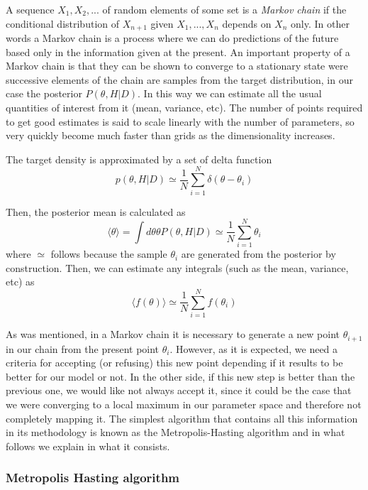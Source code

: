 \documentclass[onecolumn,           %
               showpacs,            %
               preprintnumbers,     %
               aps,                 %
               prl,          	    %
               letterpaper,             %
               superscriptaddress,      %
               nofootinbib,         %
               tightenlines,        %
               floats,floatfix      %
               ,usenatbib,
               ]{revtex4-1}
\begin{document}
A sequence $X_1,X_2,...$ of random elements of some set is a \textit{Markov chain} if the conditional distribution of $X_{n+1}$ given $X_1,...,X_n$ depends on $X_n$ only. In other words a Markov chain is a process where we can do predictions of the future based only in the information given at the present. An important property of a Markov chain is that they can be shown to converge to a stationary state were successive elements of the chain are samples from the target distribution, in our case the posterior $P(\theta,H|D)$. In this way we can estimate all the usual quantities of interest from it (mean, variance, etc). The number of points required to get good estimates is said to scale linearly with the number of parameters, so very quickly become much faster than grids as the dimensionality increases.

The target density is approximated by a set of delta function
\begin{equation}
p(\theta,H|D)\simeq \frac{1}{N}\sum_{i=1}^N \delta(\theta-\theta_i)
\end{equation}

Then, the posterior mean is calculated as
\begin{equation}
\langle\theta\rangle=\int d\theta \theta P(\theta,H|D)\simeq \frac{1}{N}\sum_{i=1}^N\theta_i
\end{equation}
where $\simeq$ follows because the sample $\theta_i$ are generated from the posterior by construction. Then, we can estimate any integrals (such as the mean, variance, etc) as
\begin{equation}
\langle f(\theta)\rangle \simeq\frac{1}{N}\sum_{i=1}^N f(\theta_i)
\end{equation}

As was mentioned, in a Markov chain it is necessary to generate a new point $\theta_{i+1}$ in our chain from the present point $\theta_i$. However, as it is expected, we need a criteria for accepting (or refusing) this new point depending if it results to be better for our model or not. In the other side, if this new step is better than the previous one, we would like not always accept it, since it could be the case that we were converging to a local maximum in our parameter space and therefore not completely mapping it. The simplest algorithm that contains all this information in its methodology is known as the Metropolis-Hasting algorithm and in what follows we explain in what it consists.
\subsubsection{Metropolis Hasting algorithm}
\end{document}
